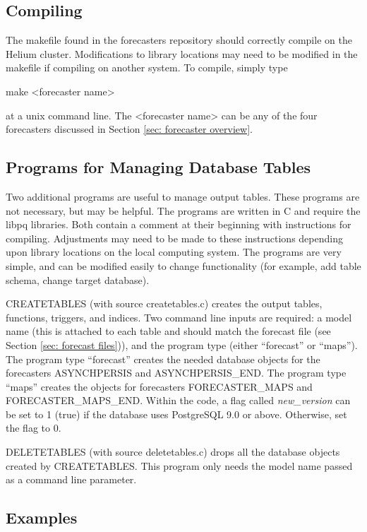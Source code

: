\documentclass[12pt]{article}
\begin{document}
\subsection{Compiling} \label{sec: compiling}

The makefile found in the forecasters repository should correctly compile on the Helium cluster. Modifications to library locations may need to be modified in the makefile if compiling on another system. To compile, simply type
\begin{center}
 make <forecaster name>
\end{center}
at a unix command line. The <forecaster name> can be any of the four forecasters discussed in Section \ref{sec: forecaster overview}.

\subsection{Programs for Managing Database Tables} \label{sec: programs for managing database tables}

Two additional programs are useful to manage output tables. These programs are not necessary, but may be helpful. The programs are written in C and require the libpq libraries. Both contain a comment at their beginning with instructions for compiling. Adjustments may need to be made to these instructions depending upon library locations on the local computing system. The programs are very simple, and can be modified easily to change functionality (for example, add table schema, change target database).

CREATETABLES (with source createtables.c) creates the output tables, functions, triggers, and indices. Two command line inputs are required: a model name (this is attached to each table and should match the forecast file (see Section \ref{sec: forecast files})), and the program type (either ``forecast'' or ``maps''). The program type ``forecast'' creates the needed database objects for the forecasters ASYNCHPERSIS and ASYNCHPERSIS\_END. The program type ``maps'' creates the objects for forecasters FORECASTER\_MAPS and FORECASTER\_MAPS\_END. Within the code, a flag called \emph{new\_version} can be set to 1 (true) if the database uses PostgreSQL 9.0 or above. Otherwise, set the flag to 0.

DELETETABLES (with source deletetables.c) drops all the database objects created by CREATETABLES. This program only needs the model name passed as a command line parameter.

\subsection{Examples} \label{sec: examples}
\end{document}
